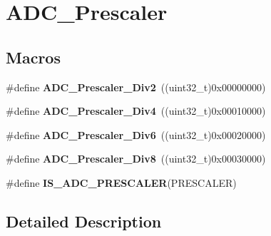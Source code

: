 \hypertarget{group___a_d_c___prescaler}{\section{A\-D\-C\-\_\-\-Prescaler}
\label{group___a_d_c___prescaler}
}
\subsection*{Macros}
\begin{DoxyCompactItemize}
\item 
\hypertarget{group___a_d_c___prescaler_gaedf3593442796684ace09bce1c6a5dde}{\#define {\bfseries A\-D\-C\-\_\-\-Prescaler\-\_\-\-Div2}~((uint32\-\_\-t)0x00000000)}\label{group___a_d_c___prescaler_gaedf3593442796684ace09bce1c6a5dde}

\item 
\hypertarget{group___a_d_c___prescaler_ga8835521adcb2239c0bc0eec8f5eb8711}{\#define {\bfseries A\-D\-C\-\_\-\-Prescaler\-\_\-\-Div4}~((uint32\-\_\-t)0x00010000)}\label{group___a_d_c___prescaler_ga8835521adcb2239c0bc0eec8f5eb8711}

\item 
\hypertarget{group___a_d_c___prescaler_ga49cb7f0ac571b5a9105ac7c037559d63}{\#define {\bfseries A\-D\-C\-\_\-\-Prescaler\-\_\-\-Div6}~((uint32\-\_\-t)0x00020000)}\label{group___a_d_c___prescaler_ga49cb7f0ac571b5a9105ac7c037559d63}

\item 
\hypertarget{group___a_d_c___prescaler_gae56f649c15bfb0cbb87f6456a320664f}{\#define {\bfseries A\-D\-C\-\_\-\-Prescaler\-\_\-\-Div8}~((uint32\-\_\-t)0x00030000)}\label{group___a_d_c___prescaler_gae56f649c15bfb0cbb87f6456a320664f}

\item 
\#define {\bfseries I\-S\-\_\-\-A\-D\-C\-\_\-\-P\-R\-E\-S\-C\-A\-L\-E\-R}(P\-R\-E\-S\-C\-A\-L\-E\-R)
\end{DoxyCompactItemize}


\subsection{Detailed Description}


